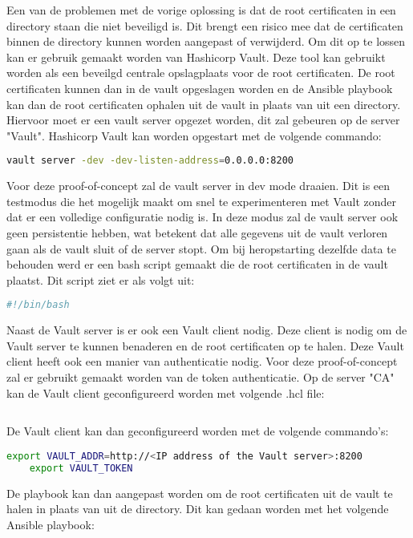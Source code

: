 Een van de problemen met de vorige oplossing is dat de root certificaten in een directory staan die niet beveiligd is. Dit brengt een risico mee dat de certificaten binnen de directory kunnen worden aangepast of verwijderd.
Om dit op te lossen kan er gebruik gemaakt worden van Hashicorp Vault. Deze tool kan gebruikt worden als een beveilgd centrale opslagplaats voor de root certificaten. De root certificaten kunnen dan in de vault opgeslagen worden en de Ansible playbook kan dan de root certificaten ophalen uit de vault in plaats van uit een directory.
Hiervoor moet er een vault server opgezet worden, dit zal gebeuren op de server "Vault".
Hashicorp Vault kan worden opgestart met de volgende commando:
\begin{lstlisting}[language=bash]
    vault server -dev -dev-listen-address=0.0.0.0:8200
\end{lstlisting}
Voor deze proof-of-concept zal de vault server in dev mode draaien. Dit is een testmodus die het mogelijk maakt om snel te experimenteren met Vault zonder dat er een volledige configuratie nodig is. In deze modus zal de vault server ook geen persistentie hebben, wat betekent dat alle gegevens uit de vault verloren gaan als de vault sluit of de server stopt.
Om bij heropstarting dezelfde data te behouden werd er een bash script gemaakt die de root certificaten in de vault plaatst. Dit script ziet er als volgt uit:
\begin{lstlisting}[language=bash]
#!/bin/bash
\end{lstlisting}

Naast de Vault server is er ook een Vault client nodig. Deze client is nodig om de Vault server te kunnen benaderen en de root certificaten op te halen. Deze Vault client heeft ook een manier van authenticatie nodig. Voor deze proof-of-concept zal er gebruikt gemaakt worden van de token authenticatie.
Op de server "CA" kan de Vault client geconfigureerd worden met volgende .hcl file:
\begin{lstlisting}[language=bash]
\end{lstlisting}

De Vault client kan dan geconfigureerd worden met de volgende commando's:
\begin{lstlisting}[language=bash]
    export VAULT_ADDR=http://<IP address of the Vault server>:8200
    export VAULT_TOKEN
\end{lstlisting}

De playbook kan dan aangepast worden om de root certificaten uit de vault te halen in plaats van uit de directory. Dit kan gedaan worden met het volgende Ansible playbook:
\begin{lstlisting}[language=bash]

\end{lstlisting}


